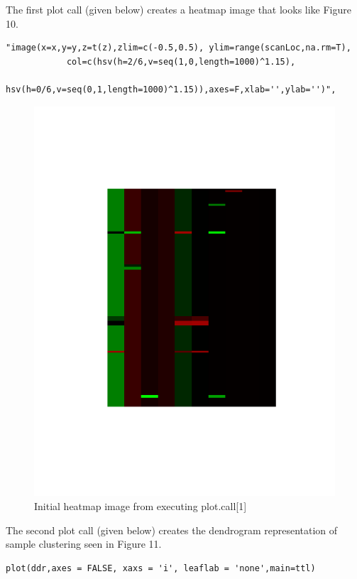 \documentclass[]{article}
\begin{document}
\indent The first plot call (given below) creates a heatmap image that looks like Figure 10. 
\begin{verbatim}
"image(x=x,y=y,z=t(z),zlim=c(-0.5,0.5), ylim=range(scanLoc,na.rm=T),
            col=c(hsv(h=2/6,v=seq(1,0,length=1000)^1.15),
            hsv(h=0/6,v=seq(0,1,length=1000)^1.15)),axes=F,xlab='',ylab='')",
\end{verbatim}
 
\begin{center}
\begin{figure}
\includegraphics[scale=.5]{heatmap}
\caption{Initial heatmap image from executing plot.call[1]}
\end{figure}
\end{center}

\indent The second plot call (given below) creates the dendrogram representation of sample clustering seen in Figure 11.
\begin{verbatim}
plot(ddr,axes = FALSE, xaxs = 'i', leaflab = 'none',main=ttl)
\end{verbatim}
\end{document}
